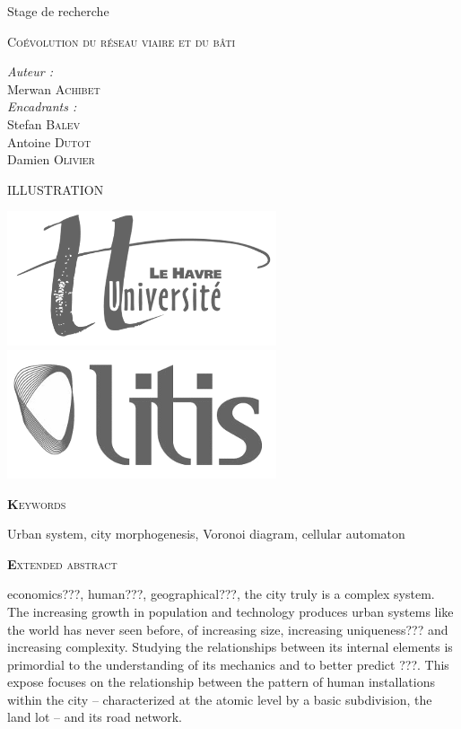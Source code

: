 \documentclass[12pt]{article}
\begin{document}
\begin{titlepage}

  Stage de recherche

  {\Large \textsc{Coévolution du réseau viaire et du bâti}}

  \begin{flushright}
    \textit{Auteur :}\\
    Merwan {\scshape Achibet}\\[0.5cm]
    \textit{Encadrants :}\\
    Stefan {\scshape Balev}\\
    Antoine {\scshape Dutot}\\
    Damien {\scshape Olivier}
  \end{flushright}

  \vfill

  \begin{center}
    ILLUSTRATION
  \end{center}

  \vfill

  \begin{center}
    \includegraphics[width=.25\linewidth]{images/logo-univ-le-havre.png}
    \qquad\qquad\qquad
    \includegraphics[width=.25\linewidth]{images/logo-litis.png}
  \end{center}

\end{titlepage}

{\scshape\textbf Keywords}

Urban system, city morphogenesis, Voronoi diagram, cellular automaton

{\scshape\textbf Extended abstract}

economics???, human???, geographical???, the city truly is a complex
system. The increasing growth in population and technology produces
urban systems like the world has never seen before, of increasing
size, increasing uniqueness??? and increasing complexity. Studying the
relationships between its internal elements is primordial to the
understanding of its mechanics and to better predict ???. This expose
focuses on the relationship between the pattern of human installations
within the city -- characterized at the atomic level by a basic
subdivision, the land lot -- and its road network.
\end{document}
